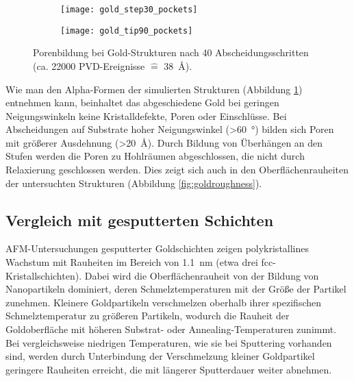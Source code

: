 \begin{figure}
  \captionsetup[subfigure]{singlelinecheck=false}
  \def\subfigwidth{0.49\textwidth}

  \begin{subfigure}[t]{\subfigwidth}
    \texttt{[image: gold\_step30\_pockets]}
    \label{fig:goldpockets-a}
  \end{subfigure}
  \hfill
  \begin{subfigure}[t]{\subfigwidth}
    \texttt{[image: gold\_tip90\_pockets]}
    \label{fig:goldpockets-b}
  \end{subfigure}

  \caption[Porenbildung bei Gold-Strukturen]{Porenbildung bei Gold-Strukturen nach 40 Abscheidungsschritten (ca. \num{22000} PVD-Ereignisse $\hat{=}$ \SI{38}{\angstrom}).
  }
  \label{fig:goldpockets}
\end{figure}

Wie man den Alpha-Formen der simulierten Strukturen (Abbildung \ref{fig:goldpockets-a}) entnehmen kann, beinhaltet das abgeschiedene Gold bei geringen Neigungswinkeln keine Kristalldefekte, Poren oder Einschlüsse.
Bei Abscheidungen auf Substrate hoher Neigungswinkel (>\SI{60}{\degree}) bilden sich Poren mit größerer Ausdehnung (>\SI{20}{\angstrom}).
Durch Bildung von Überhängen an den Stufen werden die Poren zu Hohlräumen abgeschlossen, die nicht durch Relaxierung geschlossen werden.
Dies zeigt sich auch in den Oberflächenrauheiten der untersuchten Strukturen (Abbildung \ref{fig:goldroughness}).

\clearpage
\subsection{Vergleich mit gesputterten Schichten}

AFM-Untersuchungen gesputterter Goldschichten zeigen polykristallines Wachstum mit Rauheiten im Bereich von \SI{1.1}{\nano\meter} (etwa drei fcc-Kristallschichten)\cite{svorcik_annealing_2011}.
Dabei wird die Oberflächenrauheit von der Bildung von Nanopartikeln dominiert, deren Schmelztemperaturen mit der Größe der Partikel zunehmen\cite{liu_melting_2001}.
Kleinere Goldpartikeln verschmelzen oberhalb ihrer spezifischen Schmelztemperatur zu größeren Partikeln, wodurch die Rauheit der Goldoberfläche mit höheren Substrat- oder Annealing-Temperaturen zunimmt.
Bei vergleichsweise niedrigen Temperaturen, wie sie bei Sputtering vorhanden sind, werden durch Unterbindung der Verschmelzung kleiner Goldpartikel geringere Rauheiten erreicht, die mit längerer Sputterdauer weiter abnehmen\cite{svorcik_annealing_2011}.

